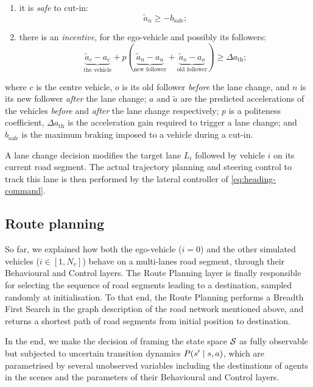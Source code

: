 \begin{enumerate}[label=(\roman*)]
	\item it is \emph{safe} to cut-in:
		\begin{equation*}
			\tilde{a}_n \geq - b_\text{safe};
		\end{equation*}
	\item there is an \emph{incentive}, for the ego-vehicle and possibly its followers:
		\begin{equation*}
		\underbrace{\tilde{a}_c - a_c}_{\text{the vehicle}} + p\left(\underbrace{\tilde{a}_n - a_n}_{\text{new follower}} + \underbrace{\tilde{a}_o - a_o}_{\text{old follower}}\right) \geq \Delta a_\text{th};
		\end{equation*}
\end{enumerate}
where $c$ is the centre vehicle, $o$ is its old follower \emph{before} the lane change, and $n$ is its new follower \emph{after} the lane change; $a$ and $\tilde{a}$ are the predicted accelerations of the vehicles \emph{before} and \emph{after} the lane change respectively; $p$ is a politeness coefficient, $\Delta a_\text{th}$ is the acceleration gain required to trigger a lane change; and $b_\text{safe}$ is the maximum braking imposed to a vehicle during a cut-in.

A lane change decision modifies the target lane $L_i$ followed by vehicle $i$ on its current road segment. The actual trajectory planning and steering control to track this lane is then performed by the lateral controller of \eqref{eq:heading-command}.

\subsection{Route planning}

So far, we explained how both the ego-vehicle ($i=0$) and the other simulated vehicles ($i\in[1, N_v]$) behave on a multi-lanes road segment, through their Behavioural and Control layers. The Route Planning layer is finally responsible for selecting the sequence of road segments leading to a destination, sampled randomly at initialisation. To that end, the Route Planning performs a Breadth First Search in the graph description of the road network mentioned above, and returns a shortest path of road segments from initial position to destination.

In the end, we make the decision of framing the state space $\mathcal{S}$ as fully observable but subjected to uncertain transition dynamics $P\lparen s' \mid s, a\rparen$, which are parametrised by several unobserved variables including the destinations of agents in the scenes and the parameters of their Behavioural and Control layers.

